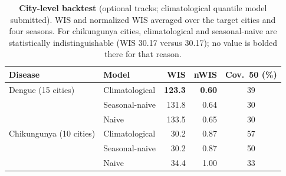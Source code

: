 \documentclass[11pt]{article}
\begin{document}
\begin{table}[t]
\centering\small
\caption{\textbf{City-level backtest} (optional tracks; climatological quantile model submitted). WIS
and normalized WIS averaged over the target cities and four seasons. For chikungunya cities,
climatological and seasonal-naive are statistically indistinguishable (WIS 30.17 versus 30.17); no
value is bolded there for that reason.}
\label{tab:city}
\begin{tabular}{@{}llrrc@{}}
\toprule
\textbf{Disease} & \textbf{Model} & \textbf{WIS} & \textbf{nWIS} & \textbf{Cov.\ 50 (\%)} \\
\midrule
Dengue (15 cities)      & Climatological & \textbf{123.3} & \textbf{0.60} & 39 \\
                        & Seasonal-naive & 131.8 & 0.64 & 30 \\
                        & Naive          & 133.5 & 0.65 & 30 \\
\addlinespace
Chikungunya (10 cities) & Climatological & 30.2 & 0.87 & 57 \\
                        & Seasonal-naive & 30.2 & 0.87 & 50 \\
                        & Naive          & 34.4 & 1.00 & 33 \\
\bottomrule
\end{tabular}
\end{table}
\end{document}
